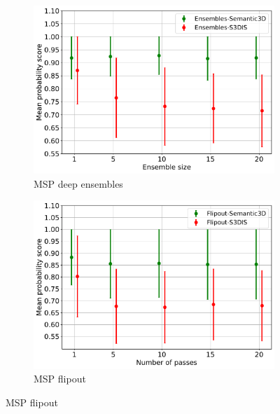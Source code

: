     \begin{figure}[!ht]
        \centering
        \begin{subfigure}{0.98\textwidth}
        \includegraphics[scale=0.6]{images/MSP/Ensembles_MSP_semvs3d.pdf}
        \caption{MSP deep ensembles}
        \label{fig:msp_ensembles}
        \end{subfigure}
        \begin{subfigure}{0.98\textwidth}
        \includegraphics[scale=0.6]{images/MSP/Flipout_MSP_semvs3d.pdf}
        \caption{MSP flipout}
        \label{fig:msp_flipout}
        \end{subfigure}
    \end{figure}

